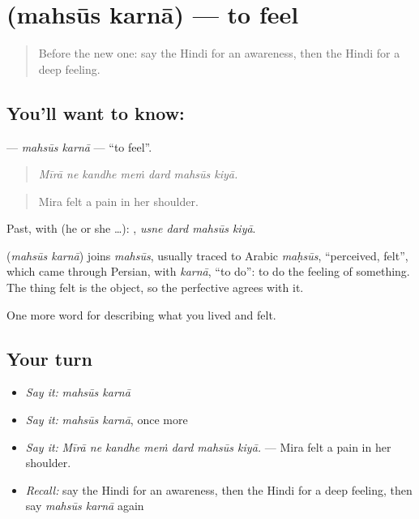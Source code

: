 \section[\texorpdfstring{\hi{महसूस} \hi{करना} (mahsūs karnā)}{महसूस करना (mahsūs karnā)}]{  (mahsūs karnā) — to feel}

\label{lesson:HI-C452-mahsuskarna}



\begin{quote}
Before the new one: say the Hindi for an awareness, then the Hindi for a deep feeling.
\end{quote}

\subsection*{You'll want to know:  }
\textbf{ } — \emph{mahsūs karnā} — \textquotedblleft{}to feel\textquotedblright{}.

\begin{quote}
      
\end{quote}

\begin{quote}
\emph{Mīrā ne kandhe meṁ dard mahsūs kiyā.}
\end{quote}

\begin{quote}
Mira felt a pain in her shoulder.
\end{quote}

Past, with  (he or she …):    , \emph{usne dard mahsūs kiyā}.

\begin{cousinweb}
\textbf{ } (\emph{mahsūs karnā}) joins \emph{mahsūs}, usually traced to Arabic \emph{maḥsūs}, \textquotedblleft{}perceived, felt\textquotedblright{}, which came through Persian, with \emph{karnā}, \textquotedblleft{}to do\textquotedblright{}: to do the feeling of something. The thing felt is the object, so the perfective agrees with it.
\end{cousinweb}

\begin{grammarlens}[title={What you've built}]
One more word for describing what you lived and felt.
\end{grammarlens}

\subsection*{Your turn}
\begin{itemize}
\raggedright
  \item \emph{Say it:} \emph{mahsūs karnā}
  \item \emph{Say it:} \emph{mahsūs karnā}, once more
  \item \emph{Say it:} \emph{Mīrā ne kandhe meṁ dard mahsūs kiyā.} — Mira felt a pain in her shoulder.
  \item \emph{Recall:} say the Hindi for an awareness, then the Hindi for a deep feeling, then say \emph{mahsūs karnā} again
\end{itemize}

